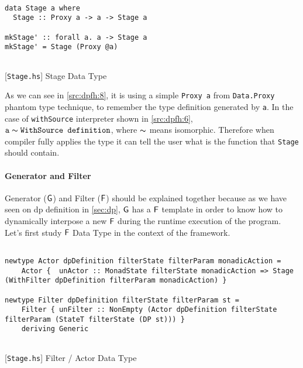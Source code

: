 \begin{listing}[H]
  \begin{verbatim}

data Stage a where
  Stage :: Proxy a -> a -> Stage a

mkStage' :: forall a. a -> Stage a
mkStage' = Stage (Proxy @a)
    
  \end{verbatim}
  \caption{[\texttt{Stage.hs}] Stage Data Type}
  \label{src:dpfh:8}
\end{listing}

As we can see in \autoref{src:dpfh:8}, it is using a simple \texttt{Proxy a} from \texttt{Data.Proxy} phantom type technique, to remember the type definition generated by \texttt{a}.
In the case of \texttt{withSource} interpreter shown in \autoref{src:dpfh:6}, \\
$\texttt{a} \thicksim \texttt{WithSource definition}$, where $\thicksim$ means isomorphic. Therefore 
when compiler fully applies the type it can tell the user what is the function that \texttt{Stage} should contain.

\paragraph{Generator and Filter}
Generator ($\mathsf{G}$) and Filter ($\mathsf{F}$) should be explained together because as we have seen on \acrshort{dp} definition in \autoref{sec:dp},
$\mathsf{G}$ has a $\mathsf{F}$ template in order to know how to dynamically interpose a new $\mathsf{F}$ during the runtime execution of the program.
Let's first study $\mathsf{F}$ Data Type in the context of the framework.

\begin{listing}[H]
  \begin{verbatim}

newtype Actor dpDefinition filterState filterParam monadicAction =
    Actor {  unActor :: MonadState filterState monadicAction => Stage (WithFilter dpDefinition filterParam monadicAction) }

newtype Filter dpDefinition filterState filterParam st =
    Filter { unFilter :: NonEmpty (Actor dpDefinition filterState filterParam (StateT filterState (DP st))) }
    deriving Generic
    
  \end{verbatim}
  \caption{[\texttt{Stage.hs}] Filter / Actor Data Type}
  \label{src:dpfh:9}
\end{listing}

